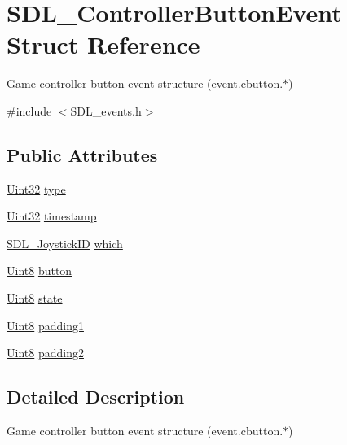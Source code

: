\hypertarget{struct_s_d_l___controller_button_event}{}\section{S\+D\+L\+\_\+\+Controller\+Button\+Event Struct Reference}
\label{struct_s_d_l___controller_button_event}


Game controller button event structure (event.\+cbutton.$\ast$)  




{\ttfamily \#include $<$S\+D\+L\+\_\+events.\+h$>$}

\subsection*{Public Attributes}
\begin{DoxyCompactItemize}
\item 
\hyperlink{_s_d_l__stdinc_8h_add440eff171ea5f55cb00c4a9ab8672d}{Uint32} \hyperlink{struct_s_d_l___controller_button_event_a09869d792031e47a88673d85915c209f}{type}
\item 
\hyperlink{_s_d_l__stdinc_8h_add440eff171ea5f55cb00c4a9ab8672d}{Uint32} \hyperlink{struct_s_d_l___controller_button_event_a73003712734c4d2f966db3d7c2ce826b}{timestamp}
\item 
\hyperlink{_s_d_l__joystick_8h_a3c3d32500cb08f76ee8077983912c0bd}{S\+D\+L\+\_\+\+Joystick\+ID} \hyperlink{struct_s_d_l___controller_button_event_a98777e88b5d5cae83eef16ffd4bcacc1}{which}
\item 
\hyperlink{_s_d_l__stdinc_8h_a2944638813a090aa23e62f4da842c3e2}{Uint8} \hyperlink{struct_s_d_l___controller_button_event_a039da6cd31c3c62e62a3ae17cc64d0db}{button}
\item 
\hyperlink{_s_d_l__stdinc_8h_a2944638813a090aa23e62f4da842c3e2}{Uint8} \hyperlink{struct_s_d_l___controller_button_event_a00c46683f86674c2a4f74404ee3e857c}{state}
\item 
\hyperlink{_s_d_l__stdinc_8h_a2944638813a090aa23e62f4da842c3e2}{Uint8} \hyperlink{struct_s_d_l___controller_button_event_a34d3e43fc1994288b9b083c874bc0899}{padding1}
\item 
\hyperlink{_s_d_l__stdinc_8h_a2944638813a090aa23e62f4da842c3e2}{Uint8} \hyperlink{struct_s_d_l___controller_button_event_a8caf56a3921227913cfb652d5de1eec4}{padding2}
\end{DoxyCompactItemize}


\subsection{Detailed Description}
Game controller button event structure (event.\+cbutton.$\ast$) 

